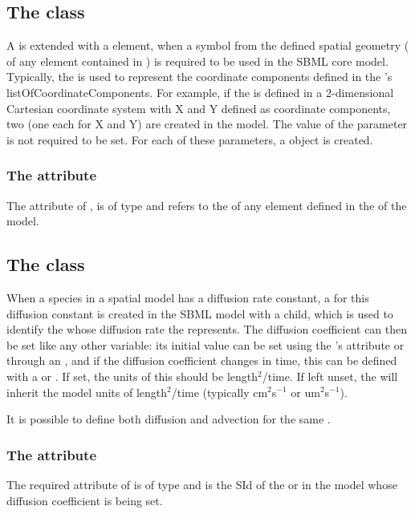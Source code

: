 \subsection{The  class}
\label{SpatialSymbolReference-class}
A \Parameter is extended with a \SpatialSymbolReference element, when a symbol from the defined spatial geometry ( of any element contained in \Geometry) is required to be used in the SBML core model. Typically, the \SpatialSymbolReference is used to represent the coordinate components defined in the \Geometry's listOfCoordinateComponents.  For example, if the \Geometry is defined in a 2-dimensional Cartesian coordinate system with X and Y defined as coordinate components, two \Parameters (one each for \CoordinateComponents X and Y) are created in the model. The value of the parameter is not required to be set. For each of these parameters, a \SpatialSymbolReference object is created.

\subsubsection{The  attribute}
The  attribute of \SpatialSymbolReference, is of type  and refers to the  of any element defined in the \Geometry of the model.

\subsection{The  class}
\label{DiffusionCoefficient-class}
When a species in a spatial model has a diffusion rate constant, a \Parameter for this diffusion constant is created in the SBML model with a \DiffusionCoefficient child, which is used to identify the \Species whose diffusion rate the \Parameter represents. The diffusion coefficient can then be set like any other variable:  its initial value can be set using the \Parameter's  attribute or through an \InitialAssignment, and if the diffusion coefficient changes in time, this can be defined with a \Rule or \Event. If set, the units of this \Parameter should be length$^2$/time.  If left unset, the \DiffusionCoefficient will inherit the model units of length$^2$/time (typically cm$^2$s$^{-1}$ or um$^2$s$^{-1}$).


It is possible to define both diffusion and advection for the same \Species.

\subsubsection{The  attribute}
The required  attribute of \DiffusionCoefficient is of type  and is the SId of the \Species or \Parameter in the model whose diffusion coefficient is being set.

